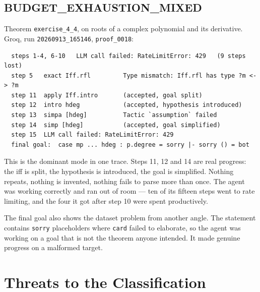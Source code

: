 \subsection{BUDGET\_EXHAUSTION\_MIXED}

Theorem \texttt{exercise\_4\_4}, on roots of a complex polynomial and its
derivative. Groq, run \texttt{20260913\_165146}, \texttt{proof\_0018}:

\begin{verbatim}
  steps 1-4, 6-10   LLM call failed: RateLimitError: 429   (9 steps lost)
  step 5   exact Iff.rfl         Type mismatch: Iff.rfl has type ?m <-> ?m
  step 11  apply Iff.intro       (accepted, goal split)
  step 12  intro hdeg            (accepted, hypothesis introduced)
  step 13  simpa [hdeg]          Tactic `assumption` failed
  step 14  simp [hdeg]           (accepted, goal simplified)
  step 15  LLM call failed: RateLimitError: 429
  final goal:  case mp ... hdeg : p.degree = sorry |- sorry () = bot
\end{verbatim}

This is the dominant mode in one trace. Steps 11, 12 and 14 are real progress:
the iff is split, the hypothesis is introduced, the goal is simplified. Nothing
repeats, nothing is invented, nothing fails to parse more than once. The agent
was working correctly and ran out of room --- ten of its fifteen steps went to
rate limiting, and the four it got after step 10 were spent productively.

The final goal also shows the dataset problem from another angle. The statement
contains \texttt{sorry} placeholders where \texttt{card} failed to elaborate, so
the agent was working on a goal that is not the theorem anyone intended. It made
genuine progress on a malformed target.

\section{Threats to the Classification}
\label{sec:ft_threats}


